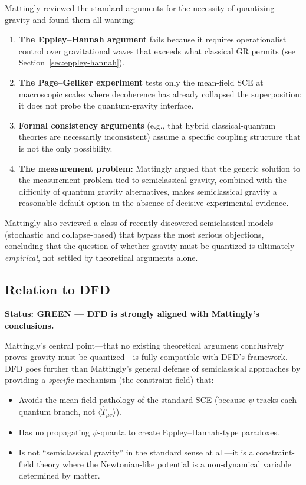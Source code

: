 \documentclass[12pt,a4paper]{article}
\newcommand{\GREEN}{\textcolor{dfdgreen}{\textbf{GREEN}}}
\begin{document}
Mattingly reviewed the standard arguments for the necessity of quantizing gravity and found them all wanting:

\begin{enumerate}
\item \textbf{The Eppley--Hannah argument} fails because it requires operationalist control over gravitational waves that exceeds what classical GR permits (see Section~\ref{sec:eppley-hannah}).

\item \textbf{The Page--Geilker experiment} tests only the mean-field SCE at macroscopic scales where decoherence has already collapsed the superposition; it does not probe the quantum-gravity interface.

\item \textbf{Formal consistency arguments} (e.g., that hybrid classical-quantum theories are necessarily inconsistent) assume a specific coupling structure that is not the only possibility.

\item \textbf{The measurement problem:} Mattingly argued that the generic solution to the measurement problem tied to semiclassical gravity, combined with the difficulty of quantum gravity alternatives, makes semiclassical gravity a reasonable default option in the absence of decisive experimental evidence.
\end{enumerate}

Mattingly also reviewed a class of recently discovered semiclassical models (stochastic and collapse-based) that bypass the most serious objections, concluding that the question of whether gravity must be quantized is ultimately \emph{empirical}, not settled by theoretical arguments alone.

\subsection{Relation to DFD}

\textbf{Status: \GREEN{} --- DFD is strongly aligned with Mattingly's conclusions.}

Mattingly's central point---that no existing theoretical argument conclusively proves gravity must be quantized---is fully compatible with DFD's framework. DFD goes further than Mattingly's general defense of semiclassical approaches by providing a \emph{specific} mechanism (the constraint field) that:

\begin{itemize}
\item Avoids the mean-field pathology of the standard SCE (because $\psi$ tracks each quantum branch, not $\langle\hat{T}_{\mu\nu}\rangle$).
\item Has no propagating $\psi$-quanta to create Eppley--Hannah-type paradoxes.
\item Is not ``semiclassical gravity'' in the standard sense at all---it is a constraint-field theory where the Newtonian-like potential is a non-dynamical variable determined by matter.
\end{itemize}
\end{document}
